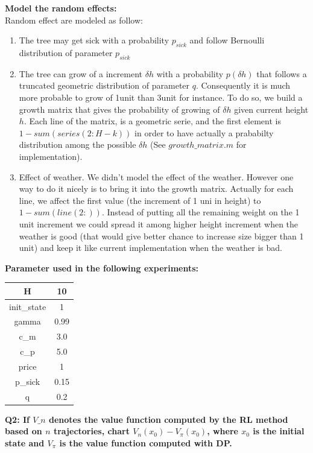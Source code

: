 \documentclass[a4paper,11pt]{exam}
\begin{document}
\textbf{Model the random effects:\\}
Random effect are modeled as follow:

\begin{enumerate}
\item The tree may get sick with a probability $p_{sick}$ and follow Bernoulli distribution of parameter $p_{sick}$
\item The tree can grow of a increment $\delta h$ with a probability $p(\delta h)$ that follows a truncated geometric distribution of parameter $q$. Consequently it is much more probable to grow of 1unit than 3unit for instance. To do so, we build a growth matrix that gives the probability of growing of  $\delta h$ given current height $h$. Each line of the matrix, is a geometric serie, and the first element is $1 - sum(series(2:H-k))$ in order to have actually a prababilty distribution among the possible $\delta h$ (See $growth\_matrix.m$ for implementation).
\item Effect of weather. We didn't model the effect of the weather. However one way to do it nicely is to bring it into the growth matrix. Actually for each line, we affect the first value (the increment of 1 uni in height) to $1-sum(line(2:))$. Instead of putting all the remaining weight on the 1 unit increment we could spread it among higher height increment when the weather is good (that would give better chance to increase size bigger than 1 unit) and keep it like current implementation when the weather is bad.
\end{enumerate}

\textbf{Parameter used in the following experiments:}

\begin{center}
	\begin{tabular}{ c | c}
		   \hline
H &  10 \\
		\hline
init\_state & 1\\
		\hline
gamma & 0.99\\
		\hline
c\_m & 3.0\\
		\hline
c\_p & 5.0\\
		\hline
price & 1\\
		\hline
p\_sick & 0.15\\
		\hline
q & 0.2\\
		\hline
 	\end{tabular}
\end{center}



\textbf{Q2: If $V\_{n}$ denotes the value function computed by the RL method based on $n$ trajectories, chart $V_{n}(x_{0})-V_{\pi}(x_{0})$, where $x_{0}$ is the initial state and $V_{\pi}$ is the value function computed with DP.\\}
\end{document}
